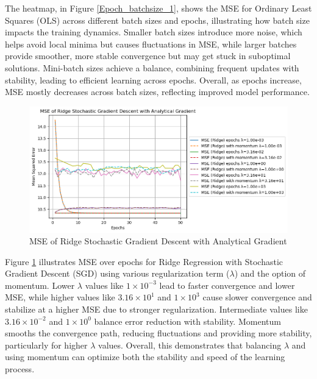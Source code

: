 \documentclass{article}
\newcommand{\0}{\mathbf{0}}
\newcommand{\1}{\mathbf{1}}
\begin{document}
The heatmap, in Figure \ref{Epoch_batchsize_1}, shows the  MSE for Ordinary Least Squares (OLS) across different batch sizes and epochs, illustrating how batch size impacts the training dynamics. Smaller batch sizes introduce more noise, which helps avoid local minima but causes fluctuations in MSE, while larger batches provide smoother, more stable convergence but may get stuck in suboptimal solutions. Mini-batch sizes achieve a balance, combining frequent updates with stability, leading to efficient learning across epochs. Overall, as epochs increase, MSE mostly decreases across batch sizes, reflecting improved model performance.

\begin{figure}[h!]
    \centering
    \includegraphics[width=1.2\linewidth]{MSE_Ridge_plot_TaskA_2.1.png}
    \caption{MSE of Ridge Stochastic Gradient Descent with Analytical Gradient}
    \label{MSE_Ridge_plot_TaskA_2}
\end{figure}

Figure \ref{MSE_Ridge_plot_TaskA_2} illustrates MSE over epochs for Ridge Regression with Stochastic Gradient Descent (SGD) using various regularization term (\(\lambda\)) and the option of momentum. Lower \(\lambda\) values like \(1 \times 10^{-3}\) lead to faster convergence and lower MSE, while higher values like \(3.16 \times 10^1\) and \(1 \times 10^3\) cause slower convergence and stabilize at a higher MSE due to stronger regularization. Intermediate values like \(3.16 \times 10^{-2}\) and \(1\times 10^{0}\) balance error reduction with stability. Momentum smooths the convergence path, reducing fluctuations and providing more stability, particularly for higher \(\lambda\) values. Overall, this demonstrates that balancing \(\lambda\) and using momentum can optimize both the stability and speed of the learning process.
\end{document}
